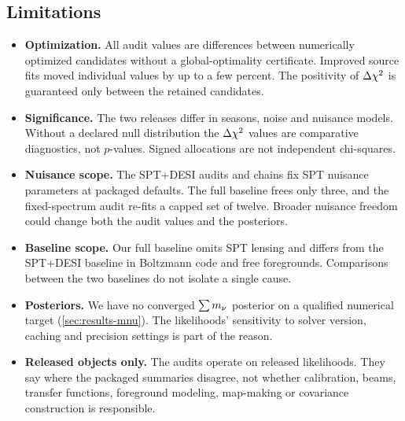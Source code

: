 \subsection{Limitations}
\begin{itemize}[leftmargin=*, itemsep=2pt]
  \item \textbf{Optimization.} All audit values are differences between numerically optimized candidates without a global-optimality certificate. Improved source fits moved individual values by up to a few percent. The positivity of $\Delta \chi^2$ is guaranteed only between the retained candidates.
  \item \textbf{Significance.} The two releases differ in seasons, noise and nuisance models. Without a declared null distribution the $\Delta \chi^2$ values are comparative diagnostics, not $p$-values. Signed allocations are not independent chi-squares.
  \item \textbf{Nuisance scope.} The SPT+DESI audits and chains fix SPT nuisance parameters at packaged defaults. The full baseline frees only three, and the fixed-spectrum audit re-fits a capped set of twelve. Broader nuisance freedom could change both the audit values and the posteriors.
  \item \textbf{Baseline scope.} Our full baseline omits SPT lensing and differs from the SPT+DESI baseline in Boltzmann code and free foregrounds. Comparisons between the two baselines do not isolate a single cause.
  \item \textbf{Posteriors.} We have no converged $\sum m_\nu$ posterior on a qualified numerical target (\cref{sec:results-mnu}). The likelihoods' sensitivity to solver version, caching and precision settings is part of the reason.
  \item \textbf{Released objects only.} The audits operate on released likelihoods. They say where the packaged summaries disagree, not whether calibration, beams, transfer functions, foreground modeling, map-making or covariance construction is responsible.
\end{itemize}

